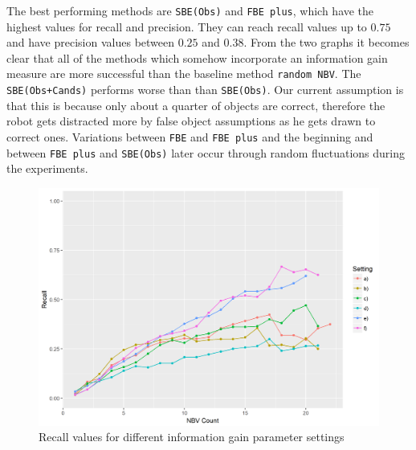 \documentclass[a4paper,11pt,english]{article}
\begin{document}
The best performing methods are \texttt{SBE(Obs)} and \texttt{FBE plus}, which have the highest values for recall and precision.
They can reach recall values up to $0.75$ and have precision values between $0.25$ and $0.38$.
From the two graphs it becomes clear that all of the methods which somehow incorporate an information gain measure are more successful than the baseline method \texttt{random NBV}.
The \texttt{SBE(Obs+Cands)} performs worse than than \texttt{SBE(Obs)}.
Our current assumption is that this is because only about a quarter of objects are correct, therefore the robot gets distracted more by false object assumptions as he gets drawn to correct ones.
Variations between \texttt{FBE} and \texttt{FBE plus} and the beginning and between \texttt{FBE plus} and \texttt{SBE(Obs)} later occur through random fluctuations during the experiments.

\begin{figure}[h]
	\begin{center}
		\includegraphics[width=\textwidth]{src/Plots/setting__recall_vs_nbv_count.png}
		\caption{Recall values for different information gain parameter settings}
		\label{fig:recall_vs_nbv_count_settings}
	\end{center}
\end{figure}
\end{document}
